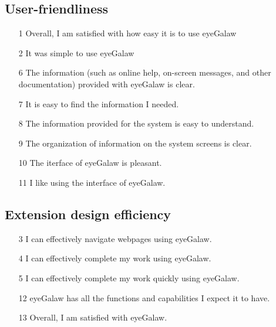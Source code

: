 \documentclass[journal]{./IEEE/IEEEtran}
\begin{document}
\subsection {User-friendliness}
\begin{enumerate}
\item  [1] Overall, I am satisfied with how easy it is to use eyeGalaw
\item [2] It was simple to use eyeGalaw
\item  [6] The information (such as online help, on-screen messages, and other documentation) provided with eyeGalaw is clear.
\item [7] It is easy to find the information I needed.
\item [8] The information provided for the system is easy to understand.
\item [9] The organization of information on the system screens is clear.
\item [10] The iterface of eyeGalaw is pleasant.
\item [11] I like using the interface of eyeGalaw.
\end {enumerate}

\subsection {Extension design efficiency}
\begin{enumerate}
\item  [3]  I can effectively navigate webpages using eyeGalaw.
\item  [4]  I can effectively complete my work using eyeGalaw.
\item  [5] I can effectively complete my work quickly  using eyeGalaw.
\item  [12]  eyeGalaw has all the functions and capabilities I expect it to have.
\item  [13] Overall, I am satisfied with eyeGalaw.
\end {enumerate}




\end{document}
